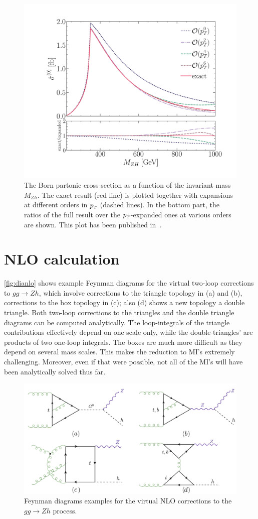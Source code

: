 \begin{figure}[htpb!]
	\centering
	\includegraphics[width=0.75\linewidth]{./figures/LO_ptexp_ratio_1000.pdf}
	\caption{The Born partonic cross-section
		as a function of the invariant mass $M_{Zh}$.
		The exact result (red line) is plotted together with expansions at
		different orders in $p_{\scriptscriptstyle T}$ (dashed lines). In the bottom part,
		the ratios of the full result over the $p_{\scriptscriptstyle T}$-expanded ones at
		various orders are shown. This plot has been published in~\cite{Alasfar:2021ppe}.}
	\label{fig:LO}
\end{figure}
\section{ NLO calculation }
\label{sec:quattro}
\autoref{fig:dianlo} shows example Feynman diagrams for the virtual two-loop corrections to $gg \to Zh$, which involve corrections to the triangle topology in (a) and (b), corrections to the box topology in (c); also (d) shows a new topology a double triangle. Both two-loop corrections to the triangles and the double triangle diagrams can be computed analytically. The loop-integrals of the triangle contributions effectively depend on one scale only, while the double-triangles' are products of two one-loop integrals. The boxes are much more difficult as they depend on several mass scales. This makes the reduction to MI's extremely challenging. Moreover, even if that were possible, not all of the MI's will have been analytically solved thus far.
\begin{figure}[htpb!]
	\begin{center}
		\includegraphics[width=12cm]{./figures/Feynman_NL0}
		\caption{Feynman diagrams examples for the virtual NLO corrections to the $gg \to Zh$ process. }
		\label{fig:dianlo}
	\end{center}
\end{figure}
